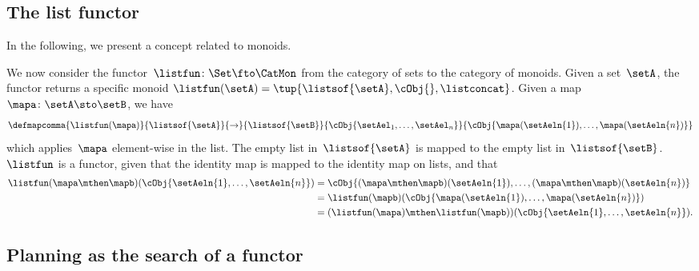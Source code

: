 \subsection{The list functor}
In the following, we present a concept related to monoids.

We now consider the functor~$\listfun\colon \Set \fto \CatMon$ from the category of sets to the category of monoids.
Given a set~$\setA$, the functor returns a specific monoid $\listfun(\setA)=\tup{\listsof{\setA},\cObj{}, \listconcat}$.
Given a map~$\mapa\colon \setA \sto \setB$, we have
\begin{equation}
    \defmapcomma{\listfun(\mapa)}
    {\listsof{\setA}}
    {\to}
    {\listsof{\setB}}
    {\cObj{\setAel_1, \ldots, \setAel_n}}
    {\cObj{\mapa(\setAeln{1}), \ldots, \mapa(\setAeln{n})}}
\end{equation}
which applies~$\mapa$ element-wise in the list.
The empty list in~$\listsof{\setA}$ is mapped to the empty list in~$\listsof{\setB}$.
    {}
$\listfun$ is a functor, given that the identity map is mapped to the identity map on lists, and that
\begin{equation}
    \begin{aligned}
        \listfun(\mapa \mthen \mapb)(\cObj{\setAeln{1},\ldots,\setAeln{n}}) & =\cObj{(\mapa \mthen \mapb)(\setAeln{1}), \ldots, (\mapa \mthen \mapb)(\setAeln{n})} \\
                                                                            & =\listfun(\mapb)(\cObj{\mapa(\setAeln{1}), \ldots, \mapa(\setAeln{n})}) \\
                                                                            & =(\listfun(\mapa)\mthen \listfun(\mapb))(\cObj{\setAeln{1}, \ldots, \setAeln{n}}).
    \end{aligned}
\end{equation}


\subsection{Planning as the search of a functor}

